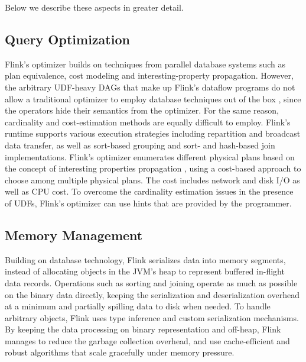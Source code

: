 \documentclass[11pt]{article}
\begin{document}
\noindent Below we describe these aspects in greater detail.

\vspace{-3mm}
\subsection{Query Optimization} 
\vspace{-2mm}
Flink's optimizer builds on techniques from parallel database systems such as plan equivalence, cost modeling and interesting-property propagation. However, the arbitrary UDF-heavy DAGs that make up Flink's dataflow programs do not allow a traditional optimizer to employ database techniques out of the box \cite{blackBoxes}, since the operators hide their semantics from the optimizer. For the same reason, cardinality and cost-estimation methods are equally difficult to employ. Flink's runtime supports various execution strategies including repartition and broadcast data transfer, as well as sort-based grouping and sort- and hash-based join implementations. Flink's optimizer enumerates different physical plans based on the concept of interesting properties propagation \cite{scopeOptimizer}, using a cost-based approach to choose among multiple physical plans. The cost includes network and disk I/O as well as CPU cost. To overcome the cardinality estimation issues in the presence of UDFs, Flink's optimizer can use hints that are provided by the programmer.

\vspace{-3mm}
\subsection{Memory Management} 
\vspace{-2mm}
Building on database technology, Flink serializes data into memory segments, instead of allocating objects in the JVM’s heap to represent buffered in-flight data records. Operations such as sorting and joining operate as much as possible on the binary data directly, keeping the serialization and deserialization overhead at a minimum and partially spilling data to disk when needed. To handle arbitrary objects, Flink uses type inference and  custom serialization mechanisms.  By keeping the data processing on binary representation and off-heap, Flink manages to reduce the garbage collection overhead, and use cache-efficient and robust algorithms that scale gracefully under memory pressure.

\vspace{-3mm}
\end{document}
